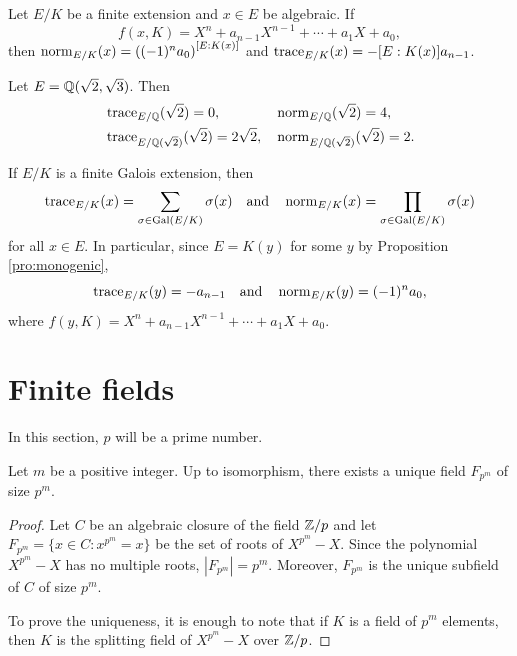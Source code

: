 \begin{exercise}
        Let $E/K$ be a finite extension and
        $x\in E$ be algebraic. If
        \[
        f(x,K)=X^n+a_{n-1}X^{n-1}+\cdots+a_1X+a_0,
        \]
        then 
        $\operatorname{norm}_{E/K}(x)=\left((-1)^na_0\right)^{[E:K(x)]}$ and 
        $\operatorname{trace}_{E/K}(x)=-[E:K(x)]a_{n-1}$. 
\end{exercise}

\begin{example}
    Let $E=\mathbb{Q}(\sqrt{2},\sqrt{3})$. Then 
    \begin{align*}
    &\operatorname{trace}_{E/\mathbb{Q}}(\sqrt{2})=0,
    &&
    \operatorname{norm}_{E/\mathbb{Q}}(\sqrt{2})=4,\\
    &\operatorname{trace}_{E/\mathbb{Q}(\sqrt{2})}(\sqrt{2})=2\sqrt{2},
    &&\operatorname{norm}_{E/\mathbb{Q}(\sqrt{2})}(\sqrt{2})=2.    
    \end{align*}
\end{example}

\begin{example}
    If $E/K$ is a finite Galois extension, then 
    \[
    \operatorname{trace}_{E/K}(x)=\sum_{\sigma\in\operatorname{Gal}(E/K)}\sigma(x)
    \quad\text{and}\quad
    \operatorname{norm}_{E/K}(x)=\prod_{\sigma\in\operatorname{Gal}(E/K)}\sigma(x)
    \]
    for all $x\in E$. In particular, since $E=K(y)$ for some
    $y$ by Proposition \ref{pro:monogenic}, 
    \[
    \operatorname{trace}_{E/K}(y)=-a_{n-1}
    \quad\text{and}\quad
    \operatorname{norm}_{E/K}(y)=(-1)^na_0,
    \]
    where
    $f(y,K)=X^n+a_{n-1}X^{n-1}+\cdots+a_1X+a_0$.
\end{example}        

\section{Finite fields}

In this section, $p$ will be a prime number. 

\begin{proposition}
    Let $m$ be a positive integer. 
    Up to isomorphism, there exists a unique 
    field $F_{p^m}$ of size $p^m$. 
\end{proposition}

\begin{proof}
    Let $C$ be an algebraic closure of the field $\mathbb{Z}/p$ and 
    let $F_{p^m}=\{x\in C:x^{p^m}=x\}$ be the set of roots of $X^{p^m}-X$. Since 
    the polynomial $X^{p^m}-X$ has no multiple roots, $|F_{p^m}|=p^m$. Moreover, 
    $F_{p^m}$ is the unique subfield of $C$ of size $p^m$. 
    
    To prove the uniqueness, it is enough to note that 
    if $K$ is a field of $p^m$ elements, then
    $K$ is the splitting field of $X^{p^m}-X$ over $\mathbb{Z}/p$.  
\end{proof}

